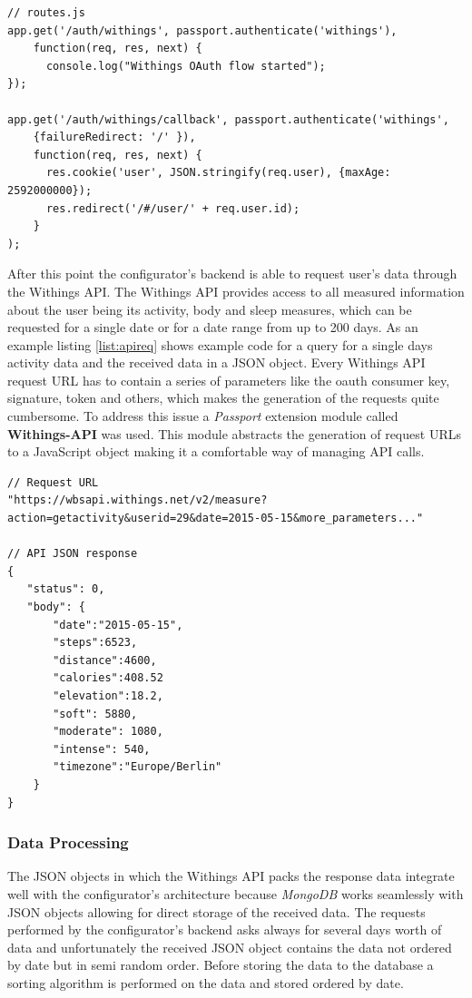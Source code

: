 \documentclass[../medieninformatik-arbeit.tex]{subfiles}
\begin{document}
\begin{lstlisting}[style=htmlcssjs, caption={Passport OAuth authentication implementation},label=list:auth]
// routes.js
app.get('/auth/withings', passport.authenticate('withings'),
    function(req, res, next) {
      console.log("Withings OAuth flow started");
});

app.get('/auth/withings/callback', passport.authenticate('withings',
	{failureRedirect: '/' }),
	function(req, res, next) {
	  res.cookie('user', JSON.stringify(req.user), {maxAge: 2592000000});
	  res.redirect('/#/user/' + req.user.id);
	}
);
\end{lstlisting}
After this point the configurator's backend is able to request user's data through the Withings API. The Withings API provides access to all measured information about the user being its activity, body and sleep measures, which can be requested for a single date or for a date range from up to 200 days. As an example listing \ref{list:apireq} shows example code for a query for a single days activity data and the received data in a JSON object. Every Withings API request URL has to contain a series of parameters like the oauth consumer key, signature, token and others, which makes the generation of the requests quite cumbersome. To address this issue a \textit{Passport} extension module called \textbf{Withings-API}\cite{withingsApi} was used. This module abstracts the generation of request URLs to a JavaScript object making it a comfortable way of managing API calls. 

\begin{lstlisting}[style=htmlcssjs, caption={Withings API query and response example},label=list:apireq,float=t]
// Request URL
"https://wbsapi.withings.net/v2/measure?action=getactivity&userid=29&date=2015-05-15&more_parameters..."

// API JSON response
{
   "status": 0,
   "body": {
       "date":"2015-05-15",
       "steps":6523,
       "distance":4600,
       "calories":408.52
       "elevation":18.2,
       "soft": 5880,
       "moderate": 1080,
       "intense": 540, 
       "timezone":"Europe/Berlin"
    }
}
\end{lstlisting}

\subsubsection{Data Processing}
The JSON objects in which the Withings API packs the response data integrate well with the configurator's architecture because \textit{MongoDB} works seamlessly with JSON objects allowing for direct storage of the received data. The requests performed by the configurator's backend asks always for several days worth of data and unfortunately the received JSON object contains the data not ordered by date but in semi random order. Before storing the data to the database a sorting algorithm is performed on the data and stored ordered by date. 
\end{document}
